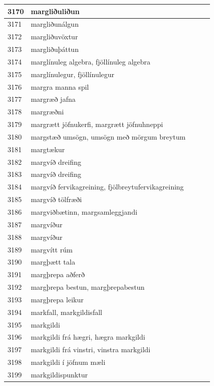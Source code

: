 \begin{longtable}{p{}|p{}|p{}|p{}|p{}}
\hline
3170 & margliðuliðun &  &  &  \\
\hline
3171 & margliðunálgun &  &  &  \\
\hline
3172 & margliðuvöxtur &  &  &  \\
\hline
3173 & margliðuþáttun &  &  &  \\
\hline
3174 & marglínuleg algebra, fjöllínuleg algebra &  &  &  \\
\hline
3175 & marglínulegur, fjöllínulegur &  &  &  \\
\hline
3176 & margra manna spil &  &  &  \\
\hline
3177 & margræð jafna &  &  &  \\
\hline
3178 & margræðni &  &  &  \\
\hline
3179 & margrætt jöfnukerfi, margrætt jöfnuhneppi &  &  &  \\
\hline
3180 & margstæð umsögn, umsögn með mörgum breytum &  &  &  \\
\hline
3181 & margtækur &  &  &  \\
\hline
3182 & margvíð dreifing &  &  &  \\
\hline
3183 & margvíð dreifing &  &  &  \\
\hline
3184 & margvíð fervikagreining, fjölbreytufervikagreining &  &  &  \\
\hline
3185 & margvíð tölfræði &  &  &  \\
\hline
3186 & margviðbætinn, margsamleggjandi &  &  &  \\
\hline
3187 & margvíður &  &  &  \\
\hline
3188 & margvíður &  &  &  \\
\hline
3189 & margvítt rúm &  &  &  \\
\hline
3190 & margþætt tala &  &  &  \\
\hline
3191 & margþrepa aðferð &  &  &  \\
\hline
3192 & margþrepa bestun, margþrepabestun &  &  &  \\
\hline
3193 & margþrepa leikur &  &  &  \\
\hline
3194 & markfall, markgildisfall &  &  &  \\
\hline
3195 & markgildi &  &  &  \\
\hline
3196 & markgildi frá hægri, hægra markgildi &  &  &  \\
\hline
3197 & markgildi frá vinstri, vinstra markgildi &  &  &  \\
\hline
3198 & markgildi í jöfnum mæli &  &  &  \\
\hline
3199 & markgildispunktur &  &  &  \\

\end{longtable}
